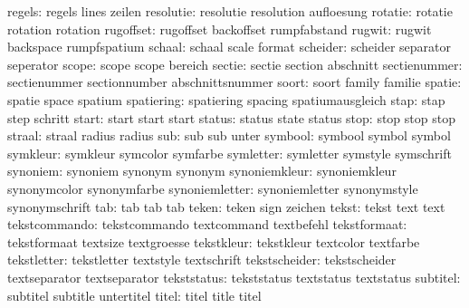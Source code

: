              regels:  regels               lines               zeilen
          resolutie:  resolutie            resolution          aufloesung
            rotatie:  rotatie              rotation            rotation
          rugoffset:  rugoffset            backoffset          rumpfabstand
             rugwit:  rugwit               backspace           rumpfspatium
             schaal:  schaal               scale               format
           scheider:  scheider             separator           seperator
              scope:  scope                scope               bereich
             sectie:  sectie               section             abschnitt
       sectienummer:  sectienummer         sectionnumber       abschnittsnummer
              soort:  soort                family              familie
             spatie:  spatie               space               spatium
         spatiering:  spatiering           spacing             spatiumausgleich
               stap:  stap                 step                schritt
              start:  start                start               start
             status:  status               state               status
               stop:  stop                 stop                stop
             straal:  straal               radius              radius
                sub:  sub                  sub                 unter
            symbool:  symbool              symbol              symbol
           symkleur:  symkleur             symcolor            symfarbe
          symletter:  symletter            symstyle            symschrift
           synoniem:  synoniem             synonym             synonym
      synoniemkleur:  synoniemkleur        synonymcolor        synonymfarbe
     synoniemletter:  synoniemletter       synonymstyle        synonymschrift
                tab:  tab                  tab                 tab
              teken:  teken                sign                zeichen
              tekst:  tekst                text                text
      tekstcommando:  tekstcommando        textcommand         textbefehl
       tekstformaat:  tekstformaat         textsize            textgroesse
         tekstkleur:  tekstkleur           textcolor           textfarbe
        tekstletter:  tekstletter          textstyle           textschrift
      tekstscheider:  tekstscheider        textseparator       textseparator
        tekststatus:  tekststatus          textstatus          textstatus
           subtitel:  subtitel             subtitle            untertitel
              titel:  titel                title               titel
